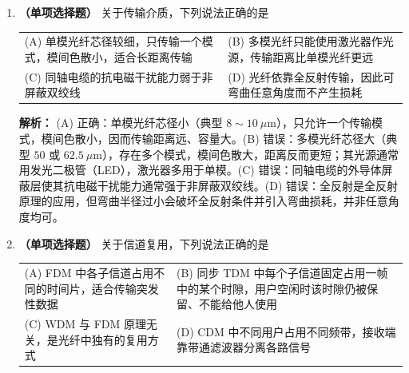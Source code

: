 \begin{enumerate}
\ifshowsolutions\par\noindent\textbf{解析：} 曼彻斯特编码在每个比特的中间必有一次跳变，该跳变既提供时钟又承载数据；本题的对应关系由题干指定：高$\to$低 $=0$，低$\to$高 $=1$。逐位译码得 0、1、1、0、0、1、0、1，即 \texttt{01100101}。选项 (B) 是把它按「高$\to$低 $=1$」的相反约定译出的结果，属于最常见的错误；其余选项是把跳变方向对应关系打乱后的产物。\else \answerarea \fi

\vspace{8pt}

\item \textbf{（单项选择题）} 关于传输介质，下列说法正确的是
\begin{center}
\begin{tabular}{p{7.2cm}p{7.2cm}}
(A) 单模光纤芯径较细，只传输一个模式，模间色散小，适合长距离传输 & (B) 多模光纤只能使用激光器作光源，传输距离比单模光纤更远 \\[4pt]
(C) 同轴电缆的抗电磁干扰能力弱于非屏蔽双绞线 & (D) 光纤依靠全反射传输，因此可弯曲任意角度而不产生损耗
\end{tabular}
\end{center}

\ifshowsolutions\par\noindent\textbf{解析：} (A) 正确：单模光纤芯径小（典型 $8\sim10\ \mu$m），只允许一个传输模式，模间色散小，因而传输距离远、容量大。(B) 错误：多模光纤芯径大（典型 $50$ 或 $62.5\ \mu$m），存在多个模式，模间色散大，距离反而更短；其光源通常用发光二极管（LED），激光器多用于单模。(C) 错误：同轴电缆的外导体屏蔽层使其抗电磁干扰能力通常强于非屏蔽双绞线。(D) 错误：全反射是全反射原理的应用，但弯曲半径过小会破坏全反射条件并引入弯曲损耗，并非任意角度均可。\else \answerarea \fi

\vspace{8pt}

\item \textbf{（单项选择题）} 关于信道复用，下列说法正确的是
\begin{center}
\begin{tabular}{p{7.2cm}p{7.2cm}}
(A) FDM 中各子信道占用不同的时间片，适合传输突发性数据 & (B) 同步 TDM 中每个子信道固定占用一帧中的某个时隙，用户空闲时该时隙仍被保留、不能给他人使用 \\[4pt]
(C) WDM 与 FDM 原理无关，是光纤中独有的复用方式 & (D) CDM 中不同用户占用不同频带，接收端靠带通滤波器分离各路信号
\end{tabular}
\end{center}


\end{enumerate}
